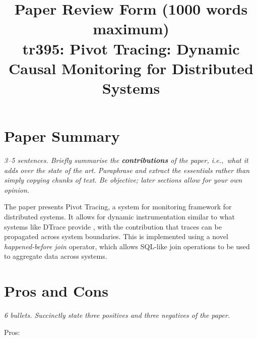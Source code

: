 \documentclass[11pt]{article}
\begin{document}

\title{Paper Review Form (1000 words maximum)\\
    tr395: Pivot Tracing: Dynamic Causal Monitoring for Distributed Systems \cite{PivotTracing}}

\maketitle

\section*{Paper Summary}

\textsl{3--5 sentences. Briefly summarise the {\bf contributions} of the paper,
i.e.,~what it adds over the state of the art. Paraphrase and extract the
essentials rather than simply copying chunks of text. Be objective; later
sections allow for your own opinion.}

The paper presents Pivot Tracing, a system for monitoring framework for
distributed systems. It allows for dynamic instrumentation similar to what
systems like DTrace provide \cite{DTrace}, with the contribution that traces
can be propagated across system boundaries. This is implemented using a novel
\textit{happened-before join} operator, which allows SQL-like join operations
to be used to aggregate data across systems.

\section*{Pros and Cons}

\textsl{6 bullets. Succinctly state three positives and three negatives of the
paper.}

Pros:
\end{document}
